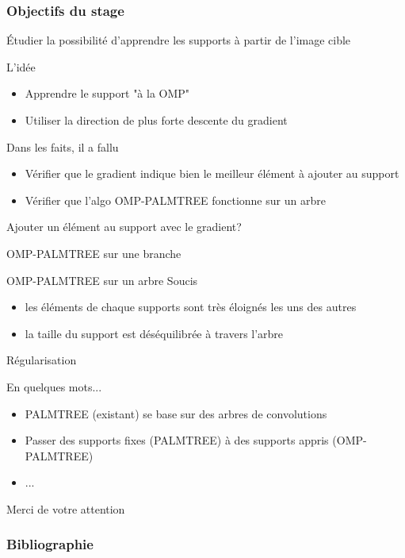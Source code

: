 \begin{frame}
	\frametitle{Objectifs du stage}
	Étudier la possibilité d'apprendre les supports à partir de l'image cible
\end{frame}



\begin{frame}{L'idée}
\begin{itemize}
	\item Apprendre le support "à la OMP"
	\item Utiliser la direction de plus forte descente du gradient
\end{itemize}
Dans les faits, il a fallu
\begin{itemize}
	\item Vérifier que le gradient indique bien le meilleur élément à ajouter au support
	\item Vérifier que l'algo OMP-PALMTREE fonctionne sur un arbre
\end{itemize}
\end{frame}


\begin{frame}{Ajouter un élément au support avec le gradient?}
\end{frame}


\begin{frame}{OMP-PALMTREE sur une branche}
\end{frame}


\begin{frame}{OMP-PALMTREE sur un arbre}
Soucis
\begin{itemize}
	\item les éléments de chaque supports sont très éloignés les uns des autres
	\item la taille du support est déséquilibrée à travers l'arbre
\end{itemize}
\end{frame}


\begin{frame}{Régularisation}
\end{frame}


\begin{frame}{En quelques mots...}
\begin{itemize}
\item PALMTREE (existant) se base sur des arbres de convolutions
\item Passer des supports fixes (PALMTREE) à des supports appris (OMP-PALMTREE)
\item ...
\end{itemize}
\vfill
\hfill Merci de votre attention
\end{frame}

\appendix

\begin{frame}
\frametitle{Bibliographie}
\printbibliography[heading=none]
\end{frame}


